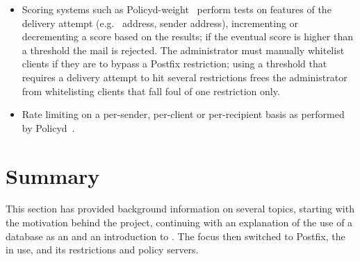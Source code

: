 \begin{itemize}
        \begin{table}[ht]
            \caption{Summary of rejections}\label{Summary of rejections}
            
        \end{table}

    \item Scoring systems such as Policyd-weight~\cite{policyd-weight}
        perform tests on features of the delivery attempt (e.g.\
         address, sender address), incrementing or decrementing
        a score based on the results; if the eventual score is higher than
        a threshold the mail is rejected.  The administrator must manually
        whitelist clients if they are to bypass a Postfix restriction;
        using a threshold that requires a delivery attempt to hit several
        restrictions frees the administrator from whitelisting clients that
        fall foul of one restriction only.

    \item Rate limiting on a per-sender, per-client or per-recipient basis
        as performed by Policyd~\cite{policyd}.

\end{itemize}



\section{Summary}

This section has provided background information on several topics,
starting with the motivation behind the project, continuing with an
explanation of the use of a database as an \acronym{API} and an
introduction to .  The focus then switched to Postfix, the
\acronym{MTA} in use, and its restrictions and policy servers.
